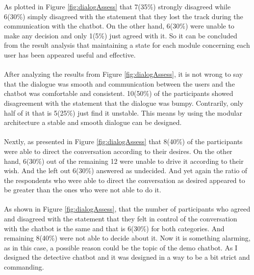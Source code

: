 \noindent
As plotted in Figure \ref{fig:dialogAssess} that 7(35\%) strongly disagreed while 6(30\%) simply disagreed with the statement that they lost the track during the communication with the chatbot. On the other hand, 6(30\%) were unable to make any decision and only 1(5\%) just agreed with it. So it can be concluded from the result analysis that maintaining a state for each module concerning each user has been appeared useful and effective.
\\~\\
After analyzing the results from Figure \ref{fig:dialogAssess}, it is not wrong to say that the dialogue was smooth and communication between the users and the chatbot was comfortable and consistent. 10(50\%) of the participants showed disagreement with the statement that the dialogue was bumpy. Contrarily, only half of it that is 5(25\%) just find it unstable. This means by using the modular architecture a stable and smooth dialogue can be designed.
\\~\\
Nextly, as presented in Figure \ref{fig:dialogAssess} that 8(40\%) of the participants were able to direct the conversation according to their desires. On the other hand, 6(30\%) out of the remaining 12 were unable to drive it according to their wish. And the left out 6(30\%) answered as undecided. And yet again the ratio of the respondents who were able to direct the conversation as desired appeared to be greater than the ones who were not able to do it.
\\~\\
As shown in Figure \ref{fig:dialogAssess}, that the number of participants who agreed and disagreed with the statement that they felt in control of the conversation with the chatbot is the same and that is 6(30\%) for both categories. And remaining 8(40\%) were not able to decide about it. Now it is something alarming, as in this case, a possible reason could be the topic of the demo chatbot. As I designed the detective chatbot and it was designed in a way to be a bit strict and commanding. 
